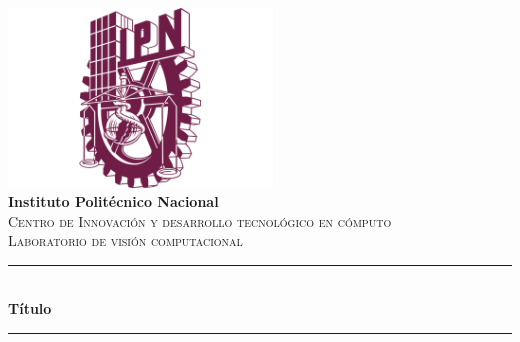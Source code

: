 \begin{titlepage}

\newcommand{\HRule}{\rule{\linewidth}{0.5mm}} %





\begin{center} %


\includegraphics[width = 7cm]{./figures/logo-ipn}\\[1.5cm] 
\textbf{\Large Instituto Politécnico Nacional}\\[1.5cm] 
\textsc{\large Centro de Innovación y desarrollo tecnológico en cómputo}\\[0.95cm] 
\textsc{\textsc{\Large Laboratorio de visión computacional}}\\[1.0cm] 


\HRule \\[0.4cm]
{ \huge \bfseries Título}\\ %
\HRule \\[1.5cm]
\end{center}


\end{titlepage}
